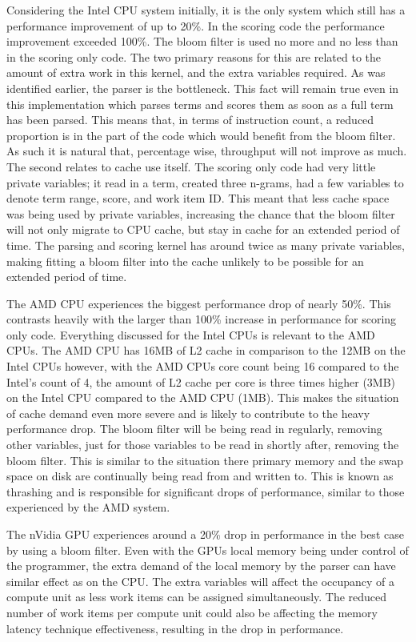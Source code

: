 Considering the Intel CPU system initially, it is the only system which still
has a performance improvement of up to 20\%. In the scoring code the performance
improvement exceeded 100\%. The bloom filter is used no more and no less than in
the scoring only code. The two primary reasons for this are related to the
amount of extra work in this kernel, and the extra variables required. As was
identified earlier, the parser is the bottleneck. This fact will remain true
even in this implementation which parses terms and scores them as soon as a full
term has been parsed. This means that, in terms of instruction count, a reduced
proportion is in the part of the code which would benefit from the bloom filter.
As such it is natural that, percentage wise, throughput will not improve as
much. The second relates to cache use itself. The scoring only code had very
little private variables; it read in a term, created three n-grams, had a few
variables to denote term range, score, and work item ID. This meant that less
cache space was being used by private variables, increasing the chance that the
bloom filter will not only migrate to CPU cache, but stay in cache for an
extended period of time. The parsing and scoring kernel has around twice as many
private variables, making fitting a bloom filter into the cache unlikely to be
possible for an extended period of time.

The AMD CPU experiences the biggest performance drop of nearly 50\%. This
contrasts heavily with the larger than 100\% increase in performance for scoring
only code. Everything discussed for the Intel CPUs is relevant to the AMD CPUs.
The AMD CPU has 16MB of L2 cache in comparison to the 12MB on the Intel CPUs
however, with the AMD CPUs core count being 16 compared to the Intel's count of
4, the amount of L2 cache per core is three times higher (3MB) on the Intel CPU
compared to the AMD CPU (1MB). This makes the situation of cache demand even
more severe and is likely to contribute to the heavy performance drop. The bloom
filter will be being read in regularly, removing other variables, just for those
variables to be read in shortly after, removing the bloom filter. This is
similar to the situation there primary memory and the swap space on disk are
continually being read from and written to. This is known as thrashing and is
responsible for significant drops of performance, similar to those experienced
by the AMD system.

The nVidia GPU experiences around a 20\% drop in performance in the best case by
using a bloom filter. Even with the GPUs local memory being under control of the
programmer, the extra demand of the local memory by the parser can have similar
effect as on the CPU. The extra variables will affect the occupancy of a compute
unit as less work items can be assigned simultaneously. The reduced number of
work items per compute unit could also be affecting the memory latency technique
effectiveness, resulting in the drop in performance.

